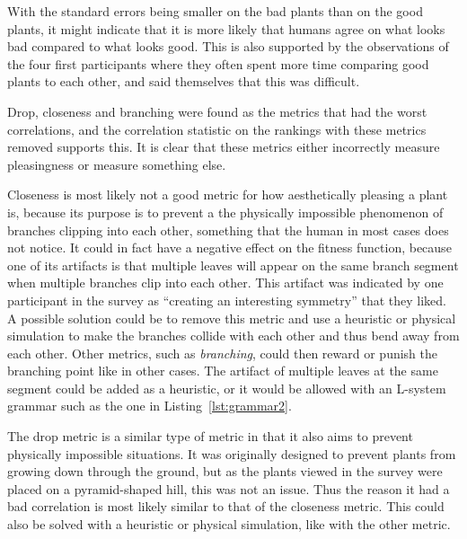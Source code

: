 With the standard errors being smaller on the bad plants than on the good plants, it might indicate that it is more likely that humans agree on what looks bad compared to what looks good.
This is also supported by the observations of the four first participants where they often spent more time comparing good plants to each other, and said themselves that this was difficult.

Drop, closeness and branching were found as the metrics that had the worst correlations, and the correlation statistic on the rankings with these metrics removed supports this.
It is clear that these metrics either incorrectly measure pleasingness or measure something else.

Closeness is most likely not a good metric for how aesthetically pleasing a plant is, because its purpose is to prevent a the physically impossible phenomenon of branches clipping into each other, something that the human in most cases does not notice.
It could in fact have a negative effect on the fitness function, because one of its artifacts is that multiple leaves will appear on the same branch segment when multiple branches clip into each other.
This artifact was indicated by one participant in the survey as ``creating an interesting symmetry'' that they liked.
A possible solution could be to remove this metric and use a heuristic or physical simulation to make the branches collide with each other and thus bend away from each other.
Other metrics, such as \textit{branching}, could then reward or punish the branching point like in other cases.
The artifact of multiple leaves at the same segment could be added as a heuristic, or it would be allowed with an \gls{L-system} grammar such as the one in Listing~\ref{lst:grammar2}.

The drop metric is a similar type of metric in that it also aims to prevent physically impossible situations.
It was originally designed to prevent plants from growing down through the ground, but as the plants viewed in the survey were placed on a pyramid-shaped hill, this was not an issue.
Thus the reason it had a bad correlation is most likely similar to that of the closeness metric.
This could also be solved with a heuristic or physical simulation, like with the other metric.

